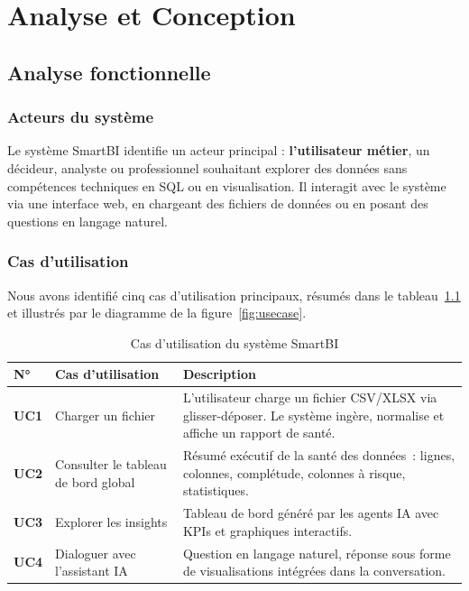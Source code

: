 \chapter{Analyse et Conception}

\section{Analyse fonctionnelle}

\subsection{Acteurs du système}

Le système SmartBI identifie un acteur principal : \textbf{l'utilisateur métier}, un décideur, analyste ou professionnel souhaitant explorer des données sans compétences techniques en SQL ou en visualisation. Il interagit avec le système via une interface web, en chargeant des fichiers de données ou en posant des questions en langage naturel.

\subsection{Cas d'utilisation}

Nous avons identifié cinq cas d'utilisation principaux, résumés dans le tableau~\ref{tab:cas-utilisation} et illustrés par le diagramme de la figure~\ref{fig:usecase}.

\begin{table}[H]
\centering
\renewcommand{\arraystretch}{1.5} %
\caption{Cas d'utilisation du système SmartBI}
\label{tab:cas-utilisation}
\begin{tabularx}{\textwidth}{
    >{\bfseries\centering\arraybackslash}p{1.2cm} 
    >{\raggedright\arraybackslash}p{4.5cm} 
    >{\raggedright\arraybackslash}X
}
\toprule
\textbf{N°} & \textbf{Cas d'utilisation} & \textbf{Description} \\
\midrule
UC1 & Charger un fichier & L'utilisateur charge un fichier CSV/XLSX via glisser-déposer. Le système ingère, normalise et affiche un rapport de santé. \\
UC2 & Consulter le tableau de bord global & Résumé exécutif de la santé des données~: lignes, colonnes, complétude, colonnes à risque, statistiques. \\
UC3 & Explorer les insights & Tableau de bord généré par les agents IA avec KPIs et graphiques interactifs. \\
UC4 & Dialoguer avec l'assistant IA & Question en langage naturel, réponse sous forme de visualisations intégrées dans la conversation. \\
\bottomrule
\end{tabularx}
\end{table}

